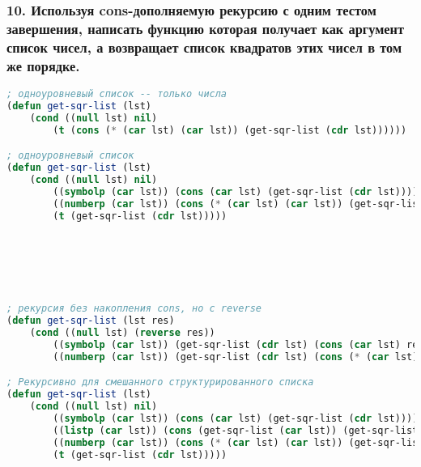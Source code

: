 \subsubsection*{10. Используя cons-дополняемую рекурсию с одним тестом завершения,	написать функцию которая получает как аргумент список чисел, а возвращает список	квадратов этих чисел в том же порядке.}
\begin{lstlisting}[language=Lisp]
; одноуровневый список -- только числа
(defun get-sqr-list (lst)
	(cond ((null lst) nil)
		(t (cons (* (car lst) (car lst)) (get-sqr-list (cdr lst))))))

; одноуровневый список
(defun get-sqr-list (lst)
	(cond ((null lst) nil)
		((symbolp (car lst)) (cons (car lst) (get-sqr-list (cdr lst))))
		((numberp (car lst)) (cons (* (car lst) (car lst)) (get-sqr-list (cdr lst))))
		(t (get-sqr-list (cdr lst)))))






; рекурсия без накопления cons, но с reverse
(defun get-sqr-list (lst res)
	(cond ((null lst) (reverse res))
		((symbolp (car lst)) (get-sqr-list (cdr lst) (cons (car lst) res)))
		((numberp (car lst)) (get-sqr-list (cdr lst) (cons (* (car lst) (car lst)) res)))))

; Рекурсивно для смешанного структурированного списка
(defun get-sqr-list (lst)
	(cond ((null lst) nil)
		((symbolp (car lst)) (cons (car lst) (get-sqr-list (cdr lst))))
		((listp (car lst)) (cons (get-sqr-list (car lst)) (get-sqr-list (cdr lst))))
		((numberp (car lst)) (cons (* (car lst) (car lst)) (get-sqr-list (cdr lst))))
		(t (get-sqr-list (cdr lst)))))
\end{lstlisting}
